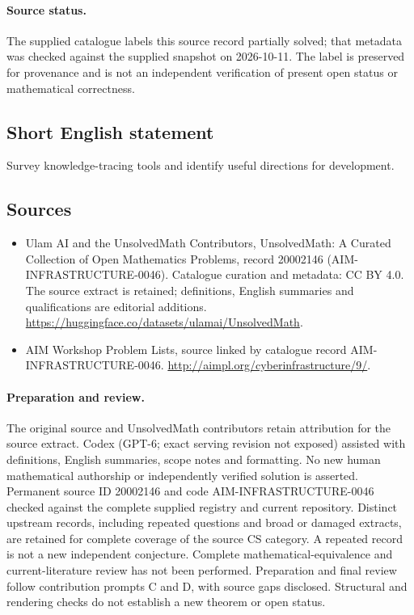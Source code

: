 \documentclass[11pt]{article}
\begin{document}
\paragraph{Source status.}
The supplied catalogue labels this source record partially solved; that metadata was checked against the supplied snapshot on 2026-10-11. The label is preserved for provenance and is not an independent verification of present open status or mathematical correctness.
\subsection{Short English statement}
Survey knowledge-tracing tools and identify useful directions for development.
\subsection{Sources}
\begin{itemize}
\item[\hypertarget{source:20002146:1}{S1}] Ulam AI and the UnsolvedMath Contributors, UnsolvedMath: A Curated Collection of Open Mathematics Problems, record 20002146 (AIM-INFRASTRUCTURE-0046). Catalogue curation and metadata: CC BY 4.0. The source extract is retained; definitions, English summaries and qualifications are editorial additions.
\url{https://huggingface.co/datasets/ulamai/UnsolvedMath}.
\item[\hypertarget{source:20002146:2}{S2}] AIM Workshop Problem Lists, source linked by catalogue record AIM-INFRASTRUCTURE-0046.
\url{http://aimpl.org/cyberinfrastructure/9/}.
\end{itemize}
\paragraph{Preparation and review.}
The original source and UnsolvedMath contributors retain attribution for the source extract. Codex (GPT-6; exact serving revision not exposed) assisted with definitions, English summaries, scope notes and formatting. No new human mathematical authorship or independently verified solution is asserted. Permanent source ID 20002146 and code AIM-INFRASTRUCTURE-0046 checked against the complete supplied registry and current repository. Distinct upstream records, including repeated questions and broad or damaged extracts, are retained for complete coverage of the source CS category. A repeated record is not a new independent conjecture. Complete mathematical-equivalence and current-literature review has not been performed. Preparation and final review follow contribution prompts C and D, with source gaps disclosed. Structural and rendering checks do not establish a new theorem or open status.
\label{end:20002146}
\end{document}
